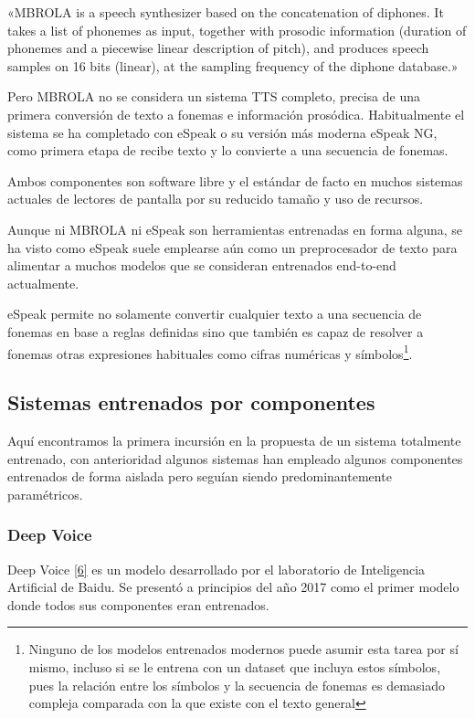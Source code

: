 «MBROLA is a speech synthesizer based on the concatenation of diphones. It takes a list of phonemes as input, together with prosodic information (duration of phonemes and a piecewise linear description of pitch), and produces speech samples on 16 bits (linear), at the sampling frequency of the diphone database.»

Pero MBROLA no se considera un sistema TTS completo, precisa de una primera conversión de texto a fonemas e información prosódica. Habitualmente el sistema se ha completado con eSpeak o su versión más moderna eSpeak NG, como primera etapa de recibe texto y lo convierte a una secuencia de fonemas.

Ambos componentes son software libre y el estándar de facto en muchos sistemas actuales de lectores de pantalla por su reducido tamaño y uso de recursos.

Aunque ni MBROLA ni eSpeak son herramientas entrenadas en forma alguna, se ha visto como eSpeak suele emplearse aún como un preprocesador de texto para alimentar a muchos modelos que se consideran entrenados end-to-end actualmente.

eSpeak permite no solamente convertir cualquier texto a una secuencia de fonemas en base a reglas definidas sino que también es capaz de resolver a fonemas otras expresiones habituales como cifras numéricas y símbolos\footnote{Ninguno de los modelos entrenados modernos puede asumir esta tarea por sí mismo, incluso si se le entrena con un dataset que incluya estos símbolos, pues la relación entre los símbolos y la secuencia de fonemas es demasiado compleja comparada con la que existe con el texto general}.


\subsection{Sistemas entrenados por componentes}

Aquí encontramos la primera incursión en la propuesta de un sistema totalmente entrenado, con anterioridad algunos sistemas han empleado algunos componentes entrenados de forma aislada pero seguían siendo predominantemente paramétricos.

\subsubsection{Deep Voice}

Deep Voice \hyperref[EA_4]{[6]} es un modelo desarrollado por el laboratorio de Inteligencia Artificial de Baidu. Se presentó a principios del año 2017 como el primer modelo donde todos sus componentes eran entrenados.

